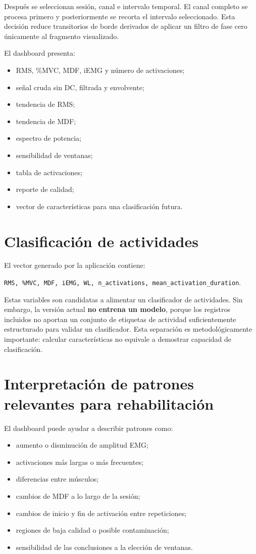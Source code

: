 \documentclass[11pt,spanish]{article}
\begin{document}
Después se seleccionan sesión, canal e intervalo temporal. El canal completo se procesa primero y posteriormente se recorta el intervalo seleccionado. Esta decisión reduce transitorios de borde derivados de aplicar un filtro de fase cero únicamente al fragmento visualizado.

El dashboard presenta:
\begin{itemize}
    \item RMS, \%MVC, MDF, iEMG y número de activaciones;
    \item señal cruda sin DC, filtrada y envolvente;
    \item tendencia de RMS;
    \item tendencia de MDF;
    \item espectro de potencia;
    \item sensibilidad de ventanas;
    \item tabla de activaciones;
    \item reporte de calidad;
    \item vector de características para una clasificación futura.
\end{itemize}

\section{Clasificación de actividades}

El vector generado por la aplicación contiene:
\begin{center}
\texttt{RMS, \%MVC, MDF, iEMG, WL, n\_activations, mean\_activation\_duration}.
\end{center}

Estas variables son candidatas a alimentar un clasificador de actividades. Sin embargo, la versión actual \textbf{no entrena un modelo}, porque los registros incluidos no aportan un conjunto de etiquetas de actividad suficientemente estructurado para validar un clasificador. Esta separación es metodológicamente importante: calcular características no equivale a demostrar capacidad de clasificación.

\section{Interpretación de patrones relevantes para rehabilitación}

El dashboard puede ayudar a describir patrones como:
\begin{itemize}
    \item aumento o disminución de amplitud EMG;
    \item activaciones más largas o más frecuentes;
    \item diferencias entre músculos;
    \item cambios de MDF a lo largo de la sesión;
    \item cambios de inicio y fin de activación entre repeticiones;
    \item regiones de baja calidad o posible contaminación;
    \item sensibilidad de las conclusiones a la elección de ventanas.
\end{itemize}
\end{document}
